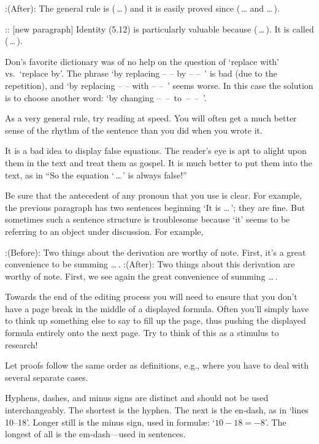 \display 80pt:(After):
The general rule is ($\,$\dots$\,$) and it is easily proved since ($\,$\dots 
and \dots$\,$).

\display 80pt::
[new paragraph] 
Identity (5.12) is particularly valuable because ($\,$\dots$\,$). It is called
($\,$\dots$\,$).

Don's favorite
dictionary was of no help on the question of `replace
with' vs.\ `replace by'. The phrase `by replacing -- -- by -- --~' is
bad (due to the repetition), and `by replacing -- -- with -- --~' seems worse.
In this case the solution is to choose another word:
`by changing --~--~to~--~--~'.

As a very general rule, try reading at speed. You will often get a
much better sense of the rhythm of the sentence than you did when you
wrote it.

It is a bad idea to display false equations. The reader's eye is apt
to alight upon them in the text and treat them as gospel. It is much
better to put them into the text, as in ``So the equation `$\,$\dots$\,$' is
always false!''

Be sure that the antecedent of any pronoun that you use is clear.
For example, the previous paragraph has two sentences beginning
`It is \dots$\,$'; they are fine. But sometimes such a sentence structure
is troublesome because `it' seems to be referring to an
object under discussion. For example, 

\display 80pt:(Before):
Two things about the derivation are worthy of note. First, it's a
great convenience to be summing \dots$\,$.
\display 80pt:(After):
Two things about this derivation are worthy of note. First, we see
again the great convenience of summing \dots$\,$.

Towards the end of the editing process you will need to ensure that
you don't have a page break in the middle of a displayed formula. Often
you'll simply have to think up something else to say to fill up the
page, thus pushing the displayed formula entirely onto the next page.
Try to think of this as a stimulus to research!

Let proofs follow the same order as definitions, e.g., where you have
to deal with several separate cases.

Hyphens, dashes, and minus signs are distinct and should not be used
interchangeably. The shortest is the hyphen. The next is the en-dash,
as in `lines 10--18'. Longer still is the minus sign, used in formul{\ae}:
`$10-18=-8$'.
The longest of all is the em-dash---used in sentences.

